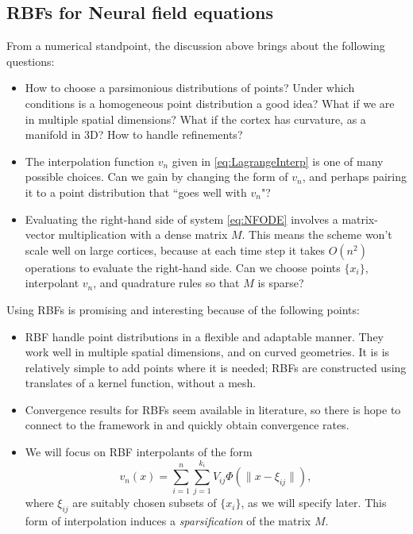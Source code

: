 \documentclass[a4paper]{siamart190516}
\begin{document}
\subsection{RBFs for Neural field equations}\label{ssec:RBFMotivation} From a
numerical standpoint, the discussion above brings about the following questions:
  \begin{itemize}
    \item How to choose a parsimonious distributions of points? Under which conditions
      is a homogeneous point distribution a good idea? What if we are in multiple
      spatial dimensions? What if the cortex has curvature, as a manifold in 3D? How
      to handle refinements?
    \item The interpolation function $v_n$ given in \cref{eq:LagrangeInterp} is one
      of many possible choices. Can we gain by changing the form of $v_n$, and
      perhaps pairing it to a point distribution that ``goes well with $v_n$"?
    \item Evaluating the right-hand side of system \cref{eq:NFODE} involves a
      matrix-vector multiplication with a dense matrix $M$. This means the scheme
      won't scale well on large cortices, because at each time step it takes
      $O(n^2)$ operations to evaluate the right-hand side. Can we choose points $\{
      x_i \}$, interpolant $v_n$, and quadrature rules so that $M$ is sparse?
  \end{itemize}

  Using RBFs is promising and interesting because of the following points:
  \begin{itemize}
      \item RBF handle point distributions in a flexible and adaptable manner. They
        work well in multiple spatial dimensions, and on curved geometries. It is is
        relatively simple to add points where it is needed; RBFs are constructed
        using translates of a kernel function, without a mesh.
      \item Convergence results for RBFs seem available in literature, so there is
        hope to connect to the framework in
        \cite{avitabileProjectionMethodsNeural2023} and quickly obtain convergence
        rates.
      \item We will focus on RBF interpolants of the form
        \begin{equation}\label{eq:RBFInterpolation}
          v_n(x) = \sum_{i=1}^{n} \sum_{j=1}^{k_i} V_{ij} \Phi(\| x - \xi_{ij} \|),
        \end{equation}
        where $\xi_{ij}$ are suitably chosen subsets of $\{ x_i \}$, as we will
        specify later. This form of interpolation induces a \textit{sparsification}
        of the matrix $M$.
  \end{itemize}
    
\end{document}
